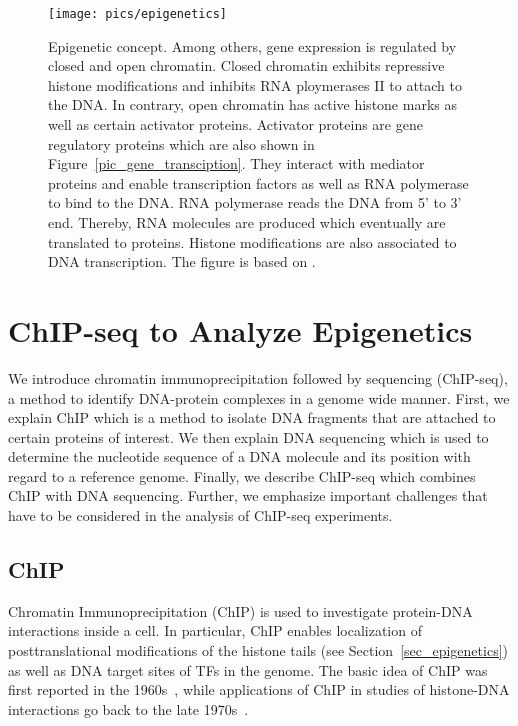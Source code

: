\begin{figure}[ht]
  \centering
  \texttt{[image: pics/epigenetics]}
\caption[Epigenetic concept]{Epigenetic concept. 
Among others, gene expression is regulated by closed and open chromatin.
Closed chromatin exhibits repressive histone modifications and inhibits RNA ploymerases II to attach to the DNA.
In contrary, open chromatin has active histone marks as well as certain activator proteins.
Activator proteins are gene regulatory proteins which are also shown in Figure~\ref{pic_gene_transciption}. 
They interact with mediator proteins and enable transcription factors as well as RNA polymerase to bind to the DNA.
RNA polymerase reads the DNA from 5' to 3' end.
Thereby, RNA molecules are produced which eventually are translated to proteins.
Histone modifications are also associated to DNA transcription.
The figure is based on \cite{Lodish2007}.
}
\label{pic_epigenetics}
\end{figure}




\section{ChIP-seq to Analyze Epigenetics}
We introduce chromatin immunoprecipitation followed by sequencing (ChIP-seq), a method to identify DNA-protein complexes in a genome wide manner.
First, we explain ChIP which is a method to isolate DNA fragments that are attached to certain proteins of interest.
We then explain DNA sequencing which is used to determine the nucleotide sequence of a DNA molecule and its position with regard to a reference genome.
Finally, we describe ChIP-seq which combines ChIP with DNA sequencing.
Further, we emphasize important challenges that have to be considered in the analysis of ChIP-seq experiments.

\subsection{ChIP}
\label{sec_chip}
Chromatin Immunoprecipitation (ChIP) is used to investigate protein-DNA interactions inside a cell.
In particular, ChIP enables localization of posttranslational modifications of the histone tails (see Section~\ref{sec_epigenetics}) as well as DNA target sites of TFs in the genome.
The basic idea of ChIP was first reported in the 1960s~\citep{Collas2010}, while applications of ChIP in studies of histone-DNA interactions go back to the late 1970s~\citep{Jackson1978}.

